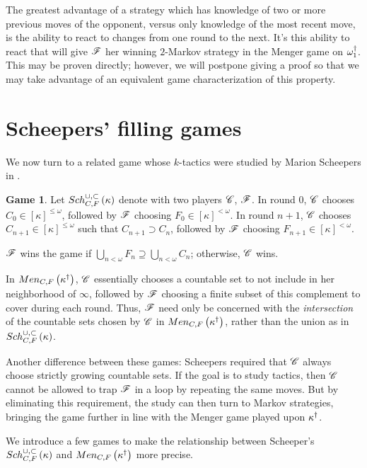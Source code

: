 \documentclass{amsart}
\theoremstyle{definition}
\newtheorem{game}[theorem]{Game}
\begin{document}
The greatest advantage of a strategy which has knowledge of two or more previous
moves of the opponent, versus only knowledge of the most recent move, is the
ability to react to changes from one round to the next. It's this ability to
react that will give \(\mathscr{F}\) her winning \(2\)-Markov strategy in the Menger
game on \(\omega^\dagger_1\). This may be proven directly; however, we will
postpone giving a proof so that we may take advantage of an equivalent
game characterization of this property.

\section{Scheepers' filling games}

We now turn to a related game whose \(k\)-tactics were studied by Marion
Scheepers in \cite{MR1129143}.

\begin{game}
  Let \(Sch^{\cup,\subset}_{C,F}\left({\kappa}\right)\) denote
  with two players \(\mathscr{C}\), \(\mathscr{F}\). In round \(0\), \(\mathscr{C}\) chooses
  \(C_0\in[\kappa]^{\leq\omega}\), followed by \(\mathscr{F}\) choosing
  \(F_0\in[\kappa]^{<\omega}\). In round \(n+1\), \(\mathscr{C}\) chooses
  \(C_{n+1}\in[\kappa]^{\leq\omega}\) such that \(C_{n+1}\supset C_n\), followed
  by \(\mathscr{F}\) choosing \(F_{n+1}\in[\kappa]^{<\omega}\).

  \(\mathscr{F}\) wins the game if
  \(\bigcup_{n<\omega} F_n\supseteq\bigcup_{n<\omega} C_n\); otherwise,
  \(\mathscr{C}\) wins.
\end{game}

In \(Men_{C,F}\left({\kappa^\dagger}\right)\), \(\mathscr{C}\) essentially chooses a countable set
to not include in her neighborhood of \(\infty\), followed by \(\mathscr{F}\) choosing
a finite subset of this complement to cover during each round. Thus,
\(\mathscr{F}\) need only be concerned with the \textit{intersection} of the
countable sets chosen by \(\mathscr{C}\) in \(Men_{C,F}\left({\kappa^\dagger}\right)\), rather
than the union as in \(Sch^{\cup,\subset}_{C,F}\left({\kappa}\right)\).

Another difference between these games:
Scheepers required that \(\mathscr{C}\) always choose strictly
growing countable sets. If the goal is to study tactics,
then \(\mathscr{C}\) cannot be allowed to trap \(\mathscr{F}\) in a loop by
repeating the same
moves. But by eliminating this requirement, the study can then turn to Markov
strategies, bringing the game further in line with the Menger game played upon
\(\kappa^\dagger\).

We introduce a few games to make the relationship between Scheeper's
\(Sch^{\cup,\subset}_{C,F}\left({\kappa}\right)\) and \(Men_{C,F}\left({\kappa^\dagger}\right)\) more precise.
\end{document}
